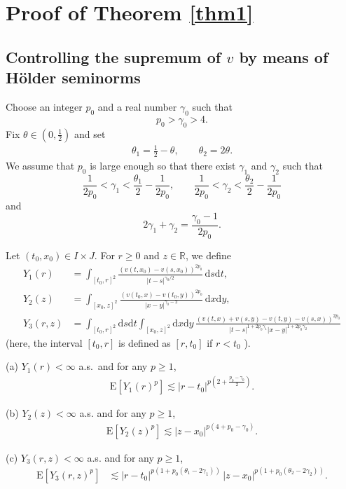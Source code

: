 \documentclass[12pt,a4paper]{article}
\newcommand{\R}{{\mathbb{R}}}
\newcommand{\E}{\mathrm{E}}
\renewcommand{\d}{\mathrm{d}}
\newcommand{\<}{\langle}
\renewcommand{\>}{\rangle}
\begin{document}
 
 \section{Proof of Theorem \ref{thm1}}\label{rd08_11s2}
 
\subsection{Controlling the supremum of $v$ by means of H\"older seminorms}


Choose an integer $p_0$ and a real number $\gamma_0$ such that
\begin{equation}\label{rd07_26e2}
p_0>\gamma_0 >4.
\end{equation}
Fix $\theta \in \left(0,\frac 12 \right)$ and set
\begin{align}\label{eq:theta12}
\theta_1=\frac 12-\theta, \qquad \theta_2=2\theta.
\end{align}
We assume that $p_0$ is large enough so that there exist $\gamma_1$ and $\gamma_2$ such that
\[
\frac 1{2p_0} <\gamma_1 <\frac {\theta_1}2 - \frac 1{2p_0}, \qquad
\frac 1{2p_0} <\gamma_2 <\frac {\theta_2}2 - \frac 1{2p_0}
\]
and
\begin{equation}\label{rd07_01e1}
2\gamma_1+\gamma_2=\frac {\gamma_0-1}{2p_0}.
\end{equation}



Let $(t_0, x_0) \in I \times J$.  For $r\ge 0$ and $z \in \R$, we define
 \begin{align*}
Y_1(r) &=\int_{[t_0,r]^2} \frac {(v(t,x_0)-v(s,x_0))^{2p_0}}{|t-s|^{\gamma_0/2}}\, \d s\d t, \\
Y_2(z)&=\int_{[x_0,z]^2} \frac {(v(t_0,x)-v(t_0,y))^{2p_0}}{|x-y|^{\gamma_0-2} }\, \d x\d y, \\
Y_3(r,z)&=\int_{[t_0,r]^2} \d s\d t \int_{[x_0,z]^2} \d x\d y\, \frac {(v(t,x)+v(s,y)-v(t,y)-v(s,x))^{2p_0}}{|t-s|^{1+2p_0\gamma_1}|x-y|^{1+2p_0\gamma_2}}
\end{align*}
 (here, the interval $[t_0, r]$ is defined as $[r, t_0]$ if $r<t_0$%
 ).
 
\begin{lemma}\label{rd07_26l1}
(a) $Y_1(r)<\infty$ a.s.~and  for any $p\ge 1$,
\begin{align}\label{eq:moment1}
   \E[Y_1(r)^p] \lesssim  |r-t_0|^{p \left(2+ \frac { p_0-\gamma_0}2 \right)}.
\end{align}

(b)  $Y_2(z)<\infty$ a.s. and for any $p\ge 1$,
\begin{align}\label{eq:moment2}
   \E[Y_2(z)^p] \lesssim  |z-x_0|^{p(4+p_0-\gamma_0)}.
\end{align}

(c) $Y_3(r, z)<\infty$ a.s. and for any $p\ge 1$,
 \begin{align}\label{eq:moment3}
   \E[Y_3(r,z)^p]  &\lesssim |r-t_0|^{p(1+p_0(\theta_1-2\gamma_1))}\, |z-x_0|^{p(1+p_0(\theta_2-2\gamma_2))}.
\end{align}
 \end{lemma}
 
\end{document}
